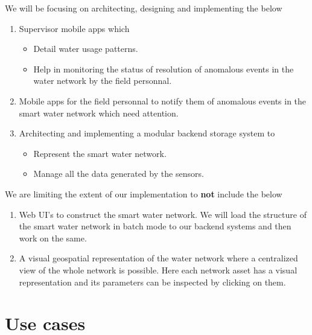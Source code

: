 \documentclass[paper=a4, fontsize=11pt]{scrartcl} %
\numberwithin{equation}{section} %
\numberwithin{figure}{section} %
\numberwithin{table}{section} %
\begin{document}
We will be focusing on architecting, designing and implementing the below
\begin{enumerate}
\item
Supervisor mobile apps which
\begin{itemize}
\item
Detail water usage patterns.
\item
Help in monitoring the status of resolution of anomalous events in the water network by the field personnal.
\end{itemize}
\item
Mobile apps for the field personnal to notify them of anomalous events in the smart water network which need attention.
\item
Architecting and implementing a modular backend storage system to
\begin{itemize}
\item
Represent the smart water network.
\item
Manage all the data generated by the sensors.\\
\end{itemize}
\end{enumerate}
We are limiting the extent of our implementation to \textbf{not} include the below
\begin{enumerate}
\item
Web UI's to construct the smart water network. We will load the structure of the smart water network in batch mode to our backend systems and then work on the same.
\item
A visual geospatial representation of the water network where a centralized view of the whole network is possible. Here each network asset has a visual representation and its parameters can be inspected by clicking on them.
\end{enumerate}

\section{Use cases}
\begin{usecase}
\end{usecase}
\end{document}
